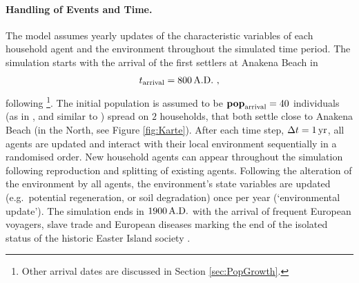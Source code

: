 \paragraph{Handling of Events and Time.}
The model assumes yearly updates of the characteristic variables of each household agent and the environment throughout the simulated time period.
The simulation starts with the arrival of the first settlers at Anakena Beach in
\begin{equation}
t_\text{arrival} = 800\, {\rm A.D.}\ ,
\end{equation}
following \citet{Bahn2017}\footnote{Other arrival dates are discussed in Section \ref{sec:PopGrowth}.}.
The initial population is assumed to be $\mathbf{pop}_{\rm arrival} = 40$ individuals (as in , and similar to ) spread on $2$ households, that both settle close to Anakena Beach (in the North, see Figure \ref{fig:Karte}).
After each time step, $\Delta t=1\,{\rm yr}$, all agents are updated and interact with their local environment sequentially in a randomised order. 
New household agents can appear throughout the simulation following reproduction and splitting of existing agents. 
Following the alteration of the environment by all agents, the environment's state variables are updated (e.g.\ potential regeneration, or soil degradation) once per year (`environmental update').
The simulation ends in $1900\, {\rm A.D.}$ with the arrival of frequent European voyagers, slave trade and European diseases marking the end of the isolated status of the historic Easter Island society .%
